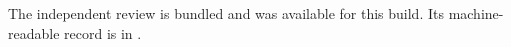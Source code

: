 The independent review is bundled and was available for this build. Its machine-readable record is in .
